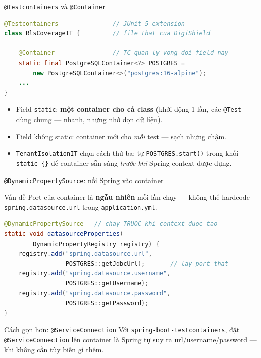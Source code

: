 \documentclass[aspectratio=169,12pt]{beamer}
\begin{document}
\begin{frame}[fragile]{\texttt{@Testcontainers} và \texttt{@Container}}
\begin{lstlisting}[language=Java,style=code]
@Testcontainers               // JUnit 5 extension
class RlsCoverageIT {         // file that cua DigiShield

    @Container                // TC quan ly vong doi field nay
    static final PostgreSQLContainer<?> POSTGRES =
        new PostgreSQLContainer<>("postgres:16-alpine");
    ...
}
\end{lstlisting}
  \begin{itemize}\small
    \item Field \texttt{static}: \textbf{một container cho cả class} (khởi động
      1 lần, các \texttt{@Test} dùng chung --- nhanh, nhưng nhớ dọn dữ liệu).
    \item Field không static: container mới cho \emph{mỗi} test --- sạch
      nhưng chậm.
    \item \texttt{TenantIsolationIT} chọn cách thứ ba: tự
      \texttt{POSTGRES.start()} trong khối \texttt{static \{\}} để container
      sẵn sàng \emph{trước khi} Spring context được dựng.
  \end{itemize}
\end{frame}

\begin{frame}[fragile]{\texttt{@DynamicPropertySource}: nối Spring vào container}
  \begin{block}{Vấn đề}
    \small Port của container là \textbf{ngẫu nhiên} mỗi lần chạy --- không thể
    hardcode \texttt{spring.datasource.url} trong \texttt{application.yml}.
  \end{block}
\begin{lstlisting}[language=Java,style=code,basicstyle=\ttfamily\scriptsize,aboveskip=0pt]
@DynamicPropertySource   // chay TRUOC khi context duoc tao
static void datasourceProperties(
        DynamicPropertyRegistry registry) {
    registry.add("spring.datasource.url",
                 POSTGRES::getJdbcUrl);       // lay port that
    registry.add("spring.datasource.username",
                 POSTGRES::getUsername);
    registry.add("spring.datasource.password",
                 POSTGRES::getPassword);
}
\end{lstlisting}
  \begin{exampleblock}{Cách gọn hơn: \texttt{@ServiceConnection}}
    \small Với \texttt{spring-boot-testcontainers}, đặt
    \texttt{@ServiceConnection} lên container là Spring tự suy ra
    url/username/password --- khi không cần tùy biến gì thêm.
  \end{exampleblock}
\end{frame}
\end{document}
